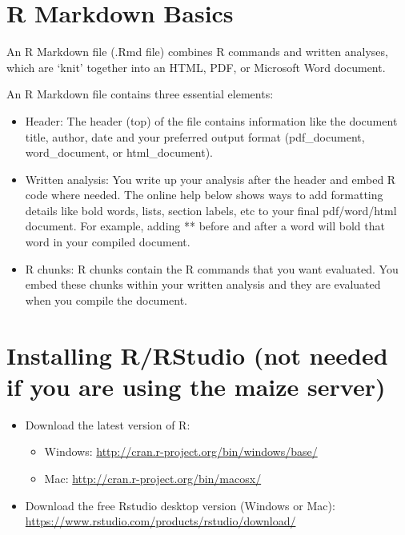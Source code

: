 \documentclass[
]{book}
\providecommand{\tightlist}{%
  \setlength{\itemsep}{0pt}\setlength{\parskip}{0pt}}
\begin{document}
\hypertarget{r-markdown-basics}{%
\section{R Markdown Basics}\label{r-markdown-basics}}

An R Markdown file (.Rmd file) combines R commands and written analyses, which are `knit' together into an HTML, PDF, or Microsoft Word document.

An R Markdown file contains three essential elements:

\begin{itemize}
\item
  Header: The header (top) of the file contains information like the document title, author, date and your preferred output format (pdf\_document, word\_document, or html\_document).
\item
  Written analysis: You write up your analysis after the header and embed R code where needed. The online help below shows ways to add formatting details like bold words, lists, section labels, etc to your final pdf/word/html document. For example, adding ** before and after a word will bold that word in your compiled document.
\item
  R chunks: R chunks contain the R commands that you want evaluated. You embed these chunks within your written analysis and they are evaluated when you compile the document.
\end{itemize}

\hypertarget{installing-rrstudio-not-needed-if-you-are-using-the-maize-server}{%
\section{Installing R/RStudio (not needed if you are using the maize server)}\label{installing-rrstudio-not-needed-if-you-are-using-the-maize-server}}

\begin{itemize}
\tightlist
\item
  Download the latest version of R:

  \begin{itemize}
  \tightlist
  \item
    Windows: \url{http://cran.r-project.org/bin/windows/base/}
  \item
    Mac: \url{http://cran.r-project.org/bin/macosx/}
  \end{itemize}
\item
  Download the free Rstudio desktop version (Windows or Mac): \url{https://www.rstudio.com/products/rstudio/download/}
\end{itemize}
\end{document}
